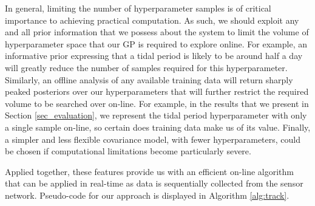 \documentclass{acmsmall}
\begin{document}
In general, limiting the number of hyperparameter samples is of critical importance to achieving practical computation. As such, we should exploit any and all prior information that we possess about the system to limit the volume of hyperparameter space that our GP is required to explore online. For example, an informative prior expressing that a tidal period is likely to be around half a day will greatly reduce the number of samples required for this hyperparameter. Similarly, an offline analysis of any available training data will return sharply peaked posteriors over our hyperparameters that will further restrict the required volume to be searched over on-line. For example, in the results that we present in Section \ref{sec_evaluation}, we represent the tidal period hyperparameter with only a single sample on-line, so certain does training data make us of its value. Finally, a simpler and less flexible covariance model, with fewer hyperparameters, could be chosen if computational limitations become particularly severe. 

Applied together, these features provide us with an efficient on-line algorithm that can be applied in real-time as data is sequentially collected from the sensor network. Pseudo-code for our approach is displayed in Algorithm \ref{alg:track}.
\end{document}
